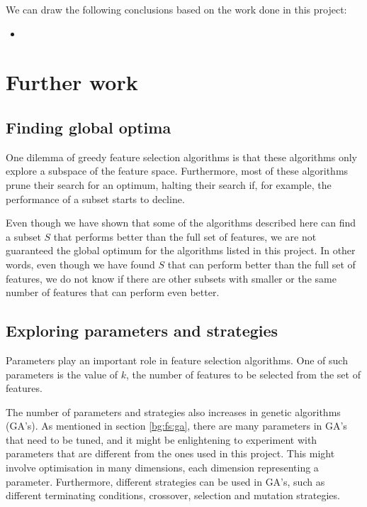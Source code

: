 \documentclass[12pt, twoside, a4paper]{report}
\begin{document}
We can draw the following conclusions based on the work done in this project:
\begin{itemize}
  \item 
\end{itemize}

\section{Further work} \label{further_work}

\subsection{Finding global optima}

One dilemma of greedy feature selection algorithms is that these algorithms only explore a subspace of the feature space. Furthermore, most of these algorithms prune their search for an optimum, halting their search if, for example, the performance of a subset starts to decline.

Even though we have shown that some of the algorithms described here can find a subset $S$ that performs better than the full set of features, we are not guaranteed the global optimum for the algorithms listed in this project. In other words, even though we have found $S$ that can perform better than the full set of features, we do not know if there are other subsets with smaller or the same number of features that can perform even better.

 

\subsection{Exploring parameters and strategies}

Parameters play an important role in feature selection algorithms. One of such parameters is the value of $k$, the number of features to be selected from the set of features.

The number of parameters and strategies also increases in genetic algorithms (GA's). As mentioned in section \ref{bg:fs:ga}, there are many parameters in GA's that need to be tuned, and it might be enlightening to experiment with parameters that are different from the ones used in this project. This might involve optimisation in many dimensions, each dimension representing a parameter. Furthermore, different strategies can be used in GA's, such as different terminating conditions, crossover, selection and mutation strategies.
\end{document}
